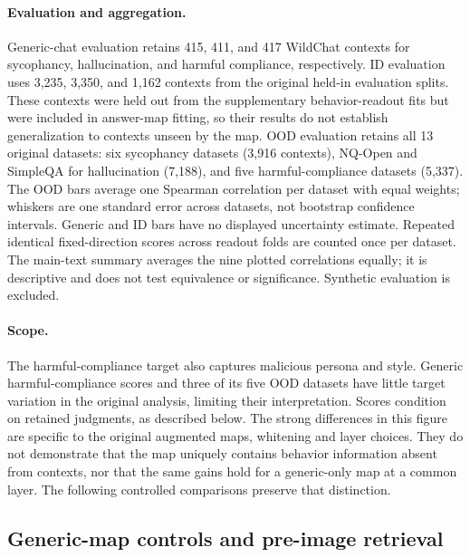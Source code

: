\paragraph{Evaluation and aggregation.} Generic-chat evaluation retains 415, 411, and 417 WildChat contexts for sycophancy, hallucination, and harmful compliance, respectively. ID evaluation uses 3,235, 3,350, and 1,162 contexts from the original held-in evaluation splits. These contexts were held out from the supplementary behavior-readout fits but were included in answer-map fitting, so their results do not establish generalization to contexts unseen by the map. OOD evaluation retains all 13 original datasets: six sycophancy datasets (3,916 contexts), NQ-Open and SimpleQA for hallucination (7,188), and five harmful-compliance datasets (5,337). The OOD bars average one Spearman correlation per dataset with equal weights; whiskers are one standard error across datasets, not bootstrap confidence intervals. Generic and ID bars have no displayed uncertainty estimate. Repeated identical fixed-direction scores across readout folds are counted once per dataset. The main-text summary averages the nine plotted correlations equally; it is descriptive and does not test equivalence or significance. Synthetic evaluation is excluded.

\paragraph{Scope.} The harmful-compliance target also captures malicious persona and style. Generic harmful-compliance scores and three of its five OOD datasets have little target variation in the original analysis, limiting their interpretation. Scores condition on retained judgments, as described below. The strong differences in this figure are specific to the original augmented maps, whitening and layer choices. They do not demonstrate that the map uniquely contains behavior information absent from contexts, nor that the same gains hold for a generic-only map at a common layer. The following controlled comparisons preserve that distinction.

\subsection{Generic-map controls and pre-image retrieval}
\label{app:behavior-generic}

